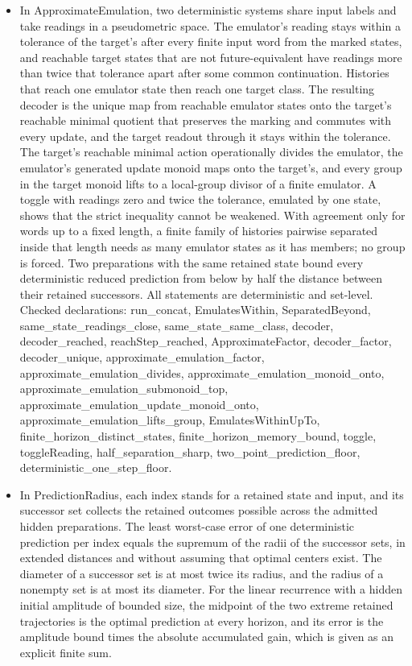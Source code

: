\documentclass[11pt,a4paper]{article}
\newcommand{\lean}[1]{{\ttfamily\small
  \let\leanunderscore\_\def\_{\leanunderscore\allowbreak}#1}}
\begin{document}
\begin{itemize}[leftmargin=1.4em,itemsep=1pt]
\item {\raggedright In \lean{ApproximateEmulation}, two deterministic systems share input labels and take readings in a pseudometric space. The emulator's reading stays within a tolerance of the target's after every finite input word from the marked states, and reachable target states that are not future-equivalent have readings more than twice that tolerance apart after some common continuation. Histories that reach one emulator state then reach one target class. The resulting decoder is the unique map from reachable emulator states onto the target's reachable minimal quotient that preserves the marking and commutes with every update, and the target readout through it stays within the tolerance. The target's reachable minimal action operationally divides the emulator, the emulator's generated update monoid maps onto the target's, and every group in the target monoid lifts to a local-group divisor of a finite emulator. A toggle with readings zero and twice the tolerance, emulated by one state, shows that the strict inequality cannot be weakened. With agreement only for words up to a fixed length, a finite family of histories pairwise separated inside that length needs as many emulator states as it has members; no group is forced. Two preparations with the same retained state bound every deterministic reduced prediction from below by half the distance between their retained successors. All statements are deterministic and set-level.
Checked declarations: \lean{run\_concat}, \lean{EmulatesWithin}, \lean{SeparatedBeyond}, \lean{same\_state\_readings\_close}, \lean{same\_state\_same\_class}, \lean{decoder}, \lean{decoder\_reached}, \lean{reachStep\_reached}, \lean{ApproximateFactor}, \lean{decoder\_factor}, \lean{decoder\_unique}, \lean{approximate\_emulation\_factor}, \lean{approximate\_emulation\_divides}, \lean{approximate\_emulation\_monoid\_onto}, \lean{approximate\_emulation\_submonoid\_top}, \lean{approximate\_emulation\_update\_monoid\_onto}, \lean{approximate\_emulation\_lifts\_group}, \lean{EmulatesWithinUpTo}, \lean{finite\_horizon\_distinct\_states}, \lean{finite\_horizon\_memory\_bound}, \lean{toggle}, \lean{toggleReading}, \lean{half\_separation\_sharp}, \lean{two\_point\_prediction\_floor}, \lean{deterministic\_one\_step\_floor}.\par}
\item {\raggedright In \lean{PredictionRadius}, each index stands for a retained state and input, and its successor set collects the retained outcomes possible across the admitted hidden preparations. The least worst-case error of one deterministic prediction per index equals the supremum of the radii of the successor sets, in extended distances and without assuming that optimal centers exist. The diameter of a successor set is at most twice its radius, and the radius of a nonempty set is at most its diameter. For the linear recurrence with a hidden initial amplitude of bounded size, the midpoint of the two extreme retained trajectories is the optimal prediction at every horizon, and its error is the amplitude bound times the absolute accumulated gain, which is given as an explicit finite sum.
}
\end{itemize}
\end{document}
